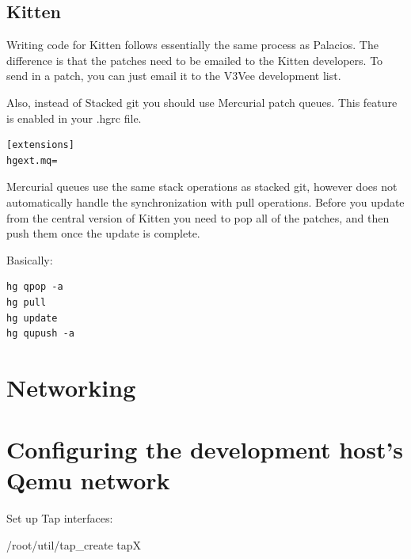 \documentclass[11pt]{article}
\begin{document}
\subsection{Kitten}

Writing code for Kitten follows essentially the same process as
Palacios. The difference is that the patches need to be emailed to the
Kitten developers. To send in a patch, you can just email it to the
V3Vee development list.


Also, instead of Stacked git you should use Mercurial patch
queues. This feature is enabled in your .hgrc file.
\begin{verbatim}
[extensions]
hgext.mq=
\end{verbatim}

Mercurial queues use the same stack operations as stacked git, however
does not automatically handle the synchronization with pull
operations. Before you update from the central version of Kitten you
need to pop all of the patches, and then push them once the update is
complete.

Basically:
\begin{verbatim}
hg qpop -a
hg pull
hg update
hg qupush -a
\end{verbatim}




\section{Networking}

\section{Configuring the development host's Qemu network}
Set up Tap interfaces:

/root/util/tap\_create tapX
\end{document}

